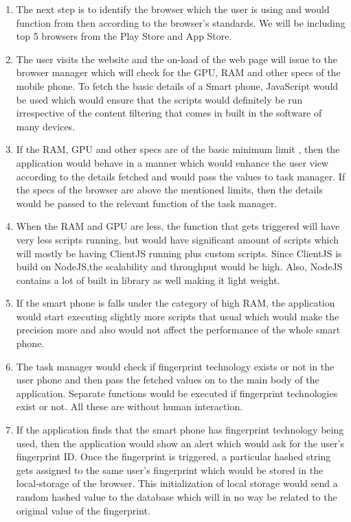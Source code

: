 \documentclass[journal]{IEEEtran}
\begin{document}
\begin{enumerate}
\begin{verbatim}
\end{verbatim}
  \item The next step is to identify the browser which the user is using and would function from then according to the browser's standards. We will be including top 5 browsers from the Play Store and App Store. 
  \item The user visits the website and the on-load of the web page will issue to the
  browser manager which will check for the GPU, RAM and other specs of the mobile phone.
  To fetch the basic details of a Smart phone, JavaScript would be used which would
  ensure that the scripts would definitely be run irrespective of the content filtering
  that comes in built in the software of many devices.
  \item If the RAM, GPU and other specs are of the basic minimum limit , then the
  application would behave in a manner which would enhance the user view according to the  details fetched and would pass the values to task manager. If the specs of the browser
  are above the mentioned limits, then the details would be passed to the relevant
  function of the task manager. 
  \item When the RAM and GPU are less, the function that gets triggered will have very less scripts running, but would have significant amount of scripts which will mostly be having ClientJS running plus custom scripts. Since ClientJS is build on NodeJS,the scalability and throughput would be high. Also, NodeJS contains a lot of built in library as well making it light weight. 
  \item If the smart phone is falls under the category of high RAM, the application would start executing slightly more scripts that usual which would make the precision more and also would not affect the performance of the whole smart phone. 
  \item The task manager would check if fingerprint technology exists or not in the user phone and then pass the fetched values on to the main body of the application. Separate
  functions would be executed if fingerprint technologies exist or not. All these are without human
  interaction.
  \item If the application finds that the smart phone has fingerprint technology being used, then the application would show an alert which would ask for the user's fingerprint ID. Once the fingerprint is triggered, a particular hashed string gets assigned to the same user's fingerprint which would be stored in the local-storage of the browser. This initialization of local storage would send a random hashed value to the database which will in no way be related to the original value of the fingerprint. 

\end{enumerate}
\end{document}
